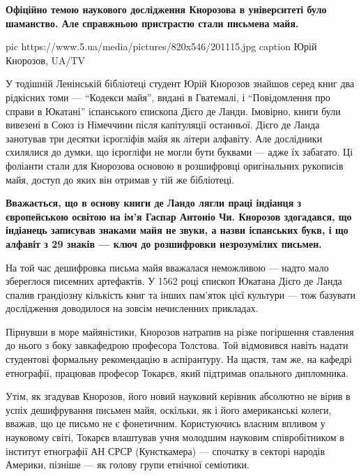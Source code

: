 \begin{leftbar}
  \bfseries
Офіційно темою наукового дослідження Кнорозова в університеті було
шаманство. Але справжньою пристрастю стали письмена майя.
\end{leftbar}

\ifcmt
pic https://www.5.ua/media/pictures/820x546/201115.jpg
caption Юрій Кнорозов, UA/TV
\fi

У тодішній Ленінській бібліотеці студент Юрій Кнорозов знайшов серед книг
два рідкісних томи --- \enquote{Кодекси майя}, видані в Гватемалі, і 
\enquote{Повідомлення
про справи в Юкатані} іспанського єпископа Дієго де Ланди. Імовірно, книги
були вивезені в Союз із Німеччини після капітуляції останньої. Дієго де
Ланда занотував три десятки ієрогліфів майя як літери алфавіту. Але
дослідники схилялися до думки, що ієрогліфи не могли бути буквами --- адже
їх забагато. Ці фоліанти стали для Кнорозова основою в розшифровці
оригінальних рукописів майя, доступ до яких він отримав у тій же
бібліотеці.

\begin{leftbar}
  \bfseries
Вважається, що в основу книги де Ландо лягли праці індіанця з
європейською освітою на ім'я Гаспар Антоніо Чи. Кнорозов здогадався, що
індіанець записував знаками майя не звуки, а назви іспанських букв, і що
алфавіт з 29 знаків --- ключ до розшифровки незрозумілих письмен.
\end{leftbar}

На той час дешифровка письма майя вважалася неможливою --- надто мало
збереглося писемних артефактів. У 1562 році єпископ Юкатана Дієго де Ланда
спалив грандіозну кількість книг та інших пам'яток цієї культури --- тож
базувати дослідження доводилося на зовсім нечисленних прикладах.

Пірнувши в море майяністики, Кнорозов натрапив на різке погіршення
ставлення до нього з боку завкафедрою професора Толстова. Той відмовився
навіть надати студентові формальну рекомендацію в аспірантуру. На щастя,
там же, на кафедрі етнографії, працював професор Токарєв, який підтримав
опального дипломника.

Утім, як згадував Кнорозов, його новий науковий керівник абсолютно не
вірив в успіх дешифрування письмен майя, оскільки, як і його американські
колеги, вважав, що це письмо не є фонетичним. Користуючись власним впливом
у науковому світі, Токарєв влаштував учня молодшим науковим співробітником
в інститут етнографії АН СРСР (Кунсткамера) --- спочатку в секторі народів
Америки, пізніше --- як голову групи етнічної семіотики.

